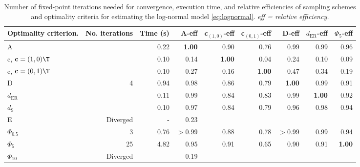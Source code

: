 \begin{table}[htb!]
\centering
\caption{Number of fixed-point iterations needed for convergence, execution time, and relative efficiencies of sampling schemes and optimality criteria for estimating the log-normal model \eqref{eq:lognormal}. \textit{eff = relative efficiency.}} 
\label{tab:baseline_impact_speed}
\begin{tabular}{lrrrrrrrr}
 Optimality criterion. & No. iterations & Time (s) & A-eff & c$_{(1,0)}$-eff & c$_{(0,1)}$-eff & D-eff & $d_{\mathrm{ER}}$-eff & $\Phi_5$-eff \\ 
  \hline
A &  & 0.22 & \textbf{1.00} & 0.90 & 0.76 & 0.99 & 0.99 & 0.96 \\ 
  c, $\mathbf{c} = (1,0)\T$ &  & 0.10 & 0.14 & \textbf{1.00} & 0.04 & 0.24 & 0.10 & 0.09 \\ 
  c, $\mathbf{c} = (0,1)\T$ &  & 0.10 & 0.27 & 0.16 & \textbf{1.00} & 0.47 & 0.34 & 0.19 \\ 
  D & 4 & 0.94 & 0.98 & 0.86 & 0.79 & \textbf{1.00} & 0.99 & 0.91 \\ 
  $d_{\mathrm{ER}}$ &  & 0.11 & 0.99 & 0.84 & 0.83 & 0.99 & \textbf{1.00} & 0.92 \\ 
  $d_{\mathrm{S}}$ &  & 0.10 & 0.97 & 0.84 & 0.79 & 0.96 & 0.98 & 0.94 \\ 
  E & Diverged & - & 0.23 &  &  &  &  &  \\ 
  $\Phi_{0.5}$ & 3 & 0.76 & $>$0.99 & 0.88 & 0.78 & $>$0.99 & 0.99 & 0.94 \\ 
  $\Phi_5$ & 25 & 4.82 & 0.95 & 0.91 & 0.65 & 0.90 & 0.91 & \textbf{1.00} \\ 
  $\Phi_{10}$ & Diverged & - & 0.19 &  &  &  &  &  \\ 
   \hline
\end{tabular}
\end{table}
